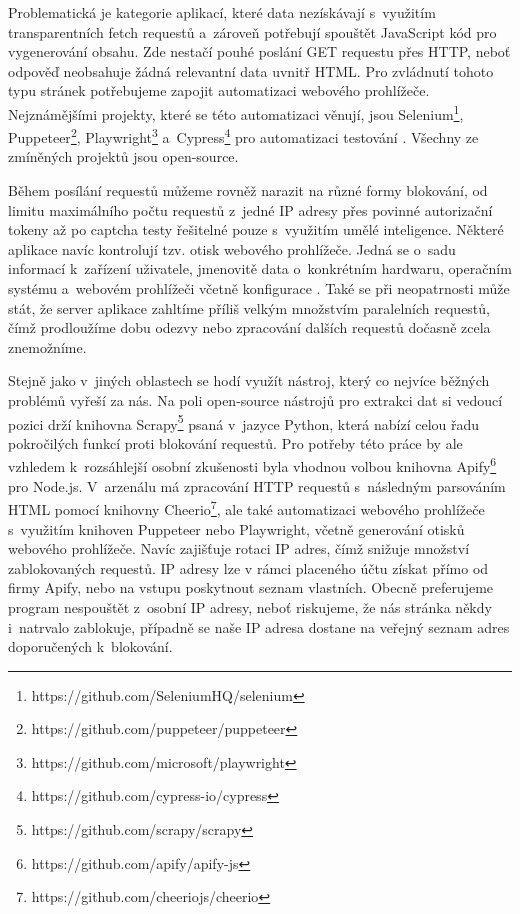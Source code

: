 Problematická je kategorie aplikací, které data nezískávají s~využitím transparentních fetch requestů a~zároveň potřebují spouštět JavaScript kód pro vygenerování obsahu. Zde nestačí pouhé poslání GET requestu přes HTTP, neboť odpověď neobsahuje žádná relevantní data uvnitř HTML. Pro zvládnutí tohoto typu stránek potřebujeme zapojit automatizaci webového prohlížeče. Nejznámějšími projekty, které se této automatizaci věnují, jsou Selenium\footnote{https://github.com/SeleniumHQ/selenium}, Puppeteer\footnote{https://github.com/puppeteer/puppeteer}, Playwright\footnote{https://github.com/microsoft/playwright} a~Cypress\footnote{https://github.com/cypress-io/cypress} pro automatizaci testování \citep{selenium-ecosystem}. Všechny ze zmíněných projektů jsou open-source.

Během posílání requestů můžeme rovněž narazit na různé formy blokování, od limitu maximálního počtu requestů z~jedné IP adresy přes povinné autorizační tokeny až po captcha testy řešitelné pouze s~využitím umělé inteligence. Některé aplikace navíc kontrolují tzv. otisk webového prohlížeče. Jedná se o~sadu informací k~zařízení uživatele, jmenovitě data o~konkrétním hardwaru, operačním systému a~webovém prohlížeči včetně konfigurace \citep{browser-fingerprints}. Také se při neopatrnosti může stát, že server aplikace zahltíme příliš velkým množstvím paralelních requestů, čímž prodloužíme dobu odezvy nebo zpracování dalších requestů dočasně zcela znemožníme.

Stejně jako v~jiných oblastech se hodí využít nástroj, který co nejvíce běžných problémů vyřeší za nás. Na poli open-source nástrojů pro extrakci dat si vedoucí pozici drží knihovna Scrapy\footnote{https://github.com/scrapy/scrapy} psaná v~jazyce Python, která nabízí celou řadu pokročilých funkcí proti blokování requestů. Pro potřeby této práce by ale vzhledem k~rozsáhlejší osobní zkušenosti byla vhodnou volbou knihovna Apify\footnote{https://github.com/apify/apify-js} pro Node.js. V~arzenálu má zpracování HTTP requestů s~následným parsováním HTML pomocí knihovny Cheerio\footnote{https://github.com/cheeriojs/cheerio}, ale také automatizaci webového prohlížeče s~využitím knihoven Puppeteer nebo Playwright, včetně generování otisků webového prohlížeče. Navíc zajišťuje rotaci IP adres, čímž snižuje množství zablokovaných requestů. IP adresy lze v rámci placeného účtu získat přímo od firmy Apify, nebo na vstupu poskytnout seznam vlastních. Obecně preferujeme program nespouštět z~osobní IP adresy, neboť riskujeme, že nás stránka někdy i~natrvalo zablokuje, případně se naše IP adresa dostane na veřejný seznam adres doporučených k~blokování.

